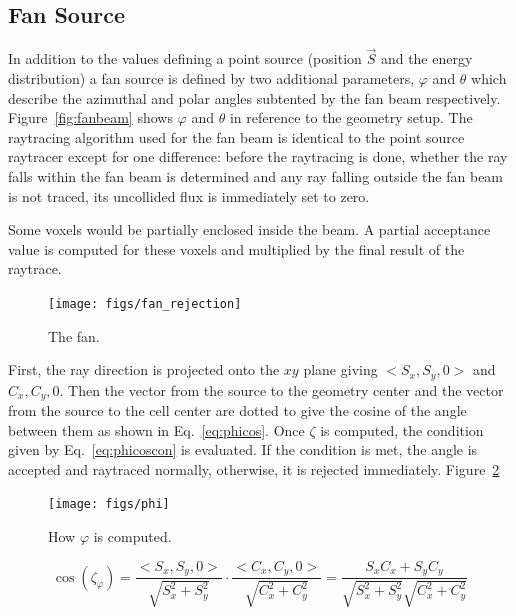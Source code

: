 \subsection{Fan Source}
In addition to the values defining a point source (position $\vec{S}$ and the energy distribution) a fan source is defined by two additional parameters, $\varphi$ and $\theta$ which describe the azimuthal and polar angles subtented by the fan beam respectively. Figure~\ref{fig:fanbeam} shows $\varphi$ and $\theta$ in reference to the geometry setup. The raytracing algorithm used for the fan beam is identical to the point source raytracer except for one difference: before the raytracing is done, whether the ray falls within the fan beam is determined and any ray falling outside the fan beam is not traced, its uncollided flux is immediately set to zero.

Some voxels would be partially enclosed inside the beam. A partial acceptance value is computed for these voxels and multiplied by the final result of the raytrace.

\begin{figure}[tb]
  \begin{center}
   \texttt{[image: figs/fan\_rejection]}
  \end{center}
  \caption{The fan.}
\label{fig:fan_rejection}
\end{figure}

First, the ray direction is projected onto the $xy$ plane giving $<S_x, S_y, 0>$ and $C_x, C_y, 0$. Then the vector from the source to the geometry center and the vector from the source to the cell center are dotted to give the cosine of the angle between them as shown in Eq.~\ref{eq:phicos}. Once $\zeta$ is computed, the condition given by Eq.~\ref{eq:phicoscon} is evaluated. If the condition is met, the angle is accepted and raytraced normally, otherwise, it is rejected immediately. Figure~\ref{fig:phi}

\begin{figure}[tb]
  \begin{center}
   \texttt{[image: figs/phi]}
  \end{center}
  \caption{How $\varphi$ is computed.}
\label{fig:phi}
\end{figure}

\begin{equation}\label{eq:phicos}
\cos(\zeta_\varphi) = \frac{<S_x, S_y, 0>}{\sqrt{S_x^2 + S_y^2}} \cdot \frac{<C_x, C_y, 0>}{\sqrt{C_x^2 + C_y^2}} = \frac{S_x C_x + S_y C_y}{\sqrt{S_x^2 + S_y^2} \sqrt{C_x^2 + C_y^2}}
\end{equation}

